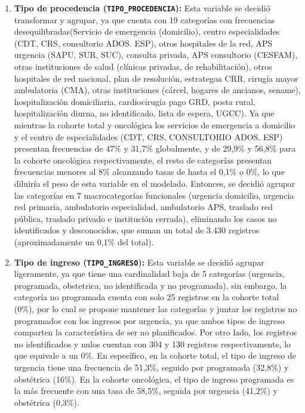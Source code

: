 \begin{enumerate}
    \item \textbf{Tipo de procedencia (\texttt{TIPO\_PROCEDENCIA}):} Esta variable se decidió transformar y agrupar, ya que cuenta con 19 categorías con frecuencias desequilibradas(Servicio de emergencia (domicilio), centro especialidades (CDT, CRS, consultorio ADOS. ESP), otros hospitales de la red, APS urgencia (SAPU, SUR, SUC), consulta privada, APS consultorio (CESFAM), otras instituciones de salud (clínicas privadas, de rehabilitación), otros hospitales de red nacional, plan de resolución, estrategoa CRR, cirugía mayor ambulatoria (CMA), otras instituciones (cárcel, hogares de ancianos, sename), hospitalización domiciliaria, cardiocirugía pago GRD, posta rural, hospitalización diurna, no identificado, lista de espera, UGCC). Ya que mientras la cohorte total y oncológica los servicios de emergencia a domicilio y el centro de especialidades (CDT, CRS, CONSULTORIO ADOS. ESP) presentan frecuencias de 47\% y 31,7\% globalmente, y de 29,9\% y 56,8\% para la cohorte oncológica respectivamente, el resto de categorías presentan frecuencias menores al 8\% alcanzando tasas de hasta el 0,1\% o 0\%, lo que diluiría el peso de esta variable en el modelado. Entonces, se decidió agrupar las categorías en 7 macrocategorías funcionales (urgencia domicilio, urgencia red primaria, ambulatorio especialidad, ambulatorio APS, traslado red pública, traslado privado e institución cerrada), eliminando los casos no identificados y desconocidos, que suman un total de 3.430 registros (aproximadamente un 0,1\% del total).
    \item \textbf{Tipo de ingreso (\texttt{TIPO\_INGRESO}):} Esta variable se decidió agrupar ligeramente, ya que tiene una cardinalidad baja de 5 categorías (urgencia, programada, obstetrica, no identificada y no programada), sin embargo, la categoría no programada cuenta con solo 25 registros en la cohorte total (0\%), por lo cual se propone mantener las categorías y juntar los registros no programados con los ingresos por urgencia, ya que ambos tipos de ingreso comparten la característica de ser no planificados. Por otro lado, los registros no identificados y nulos cuentan con 304 y 130 registros respectivamente, lo que equivale a un 0\%. En específico, en la cohorte total, el tipo de ingreso de urgencia tiene una frecuencia de 51,3\%, seguido por programada (32,8\%) y obstétrica (16\%). En la cohorte oncológica, el tipo de ingreso programada es la más frecuente con una tasa de 58,5\%, seguida por urgencia (41,2\%) y obstétrica (0,3\%).

\end{enumerate}

